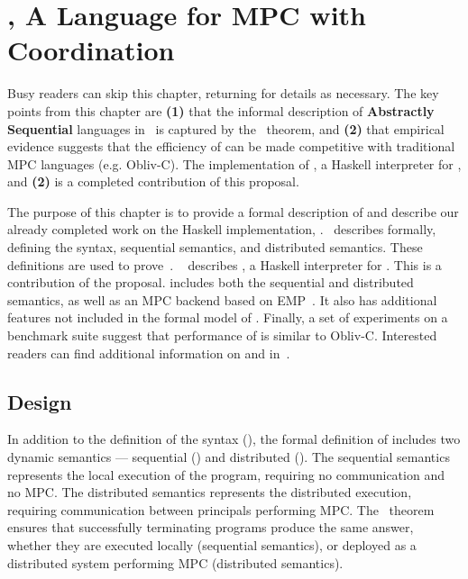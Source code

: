 \chapter{\mpc, A Language for MPC with Coordination}
\label{ch:mpc}

Busy readers can skip this chapter, returning for details as necessary. The key points from this chapter are
\textbf{(1)} that the informal description of \textbf{Abstractly Sequential} languages in~ is captured
by the~ theorem, and \textbf{(2)} that empirical evidence suggests that
the efficiency of \mpc can be made competitive with traditional MPC languages (e.g. Obliv-C). The implementation
of \system, a Haskell interpreter for \mpc, and \textbf{(2)} is a completed contribution of this proposal.

The purpose of this chapter is to provide a formal description of \mpc and describe our already completed work
on the Haskell implementation, \system.~ describes \mpc formally, defining the syntax,
sequential semantics, and distributed semantics. These definitions are used to prove~.
~ describes \system, a Haskell interpreter for \mpc. This is a contribution of the proposal.
\system includes both the sequential and distributed semantics, as well as an MPC backend based on EMP~\cite{}.
It also has additional features not included in the formal model of \mpc. Finally, a set of experiments on a
benchmark suite suggest that performance of \system is similar to Obliv-C. Interested readers can find additional
information on \mpc and \system in~\citet{todo}.

\section{Design}
\label{sec:mpc-design}

In addition to the definition of the syntax (), the formal definition of \mpc
includes two dynamic semantics --- sequential () and distributed ().
The sequential semantics represents the local execution of the program, requiring no communication
and no MPC. The distributed semantics represents the distributed execution, requiring communication
between principals performing MPC. The~ theorem ensures that successfully
terminating programs produce the same answer, whether they are executed locally (sequential semantics),
or deployed as a distributed system performing MPC (distributed semantics).

